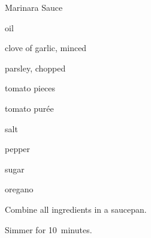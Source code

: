 \begin{recipe}{Marinara Sauce}{}{}

\begin{ingredients}
\item {} oil
\item clove of garlic, minced
\item {} parsley, chopped
\item {} tomato pieces
\item {} tomato pur\'ee
\item {} salt
\item pepper
\item \tp{\half} sugar
\item \tp{\quarter} oregano
\end{ingredients}

\begin{directions}
\item Combine all ingredients in a saucepan.
\item Simmer for 10~minutes.
\end{directions}

\end{recipe}
